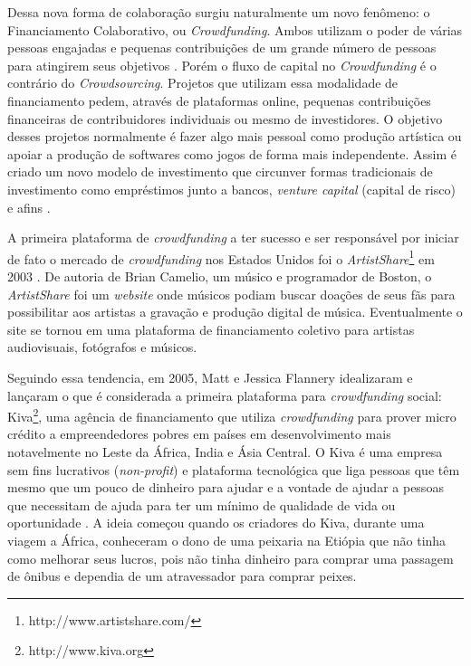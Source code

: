 Dessa nova forma de colaboração surgiu naturalmente um novo fenômeno: o Financiamento Colaborativo, ou \emph{Crowdfunding}. Ambos utilizam o poder de várias pessoas engajadas e pequenas contribuições de um grande número de pessoas para atingirem seus objetivos \cite{crowdfunding-culture}. Porém o fluxo de capital no \emph{Crowdfunding} é o contrário do \emph{Crowdsourcing}. Projetos que utilizam essa modalidade de financiamento pedem, através de plataformas online, pequenas contribuições financeiras de contribuidores individuais ou mesmo de investidores. O objetivo desses projetos normalmente é fazer algo mais pessoal como produção artística ou apoiar a produção de softwares como jogos de forma mais independente. Assim é criado um novo modelo de investimento que circunver formas tradicionais de investimento como empréstimos junto a bancos, \emph{venture capital} (capital de risco) e afins \cite{belleflamme2010}.

A primeira plataforma de \emph{crowdfunding} a ter sucesso e ser responsável por iniciar de fato o mercado de \emph{crowdfunding} nos Estados Unidos foi o \emph{ArtistShare}\footnote{http://www.artistshare.com/} em 2003 \cite{freedman2015brief}. De autoria de Brian Camelio, um músico e programador de Boston, o \emph{ArtistShare} foi um \emph{website} onde músicos podiam buscar doações de seus fãs para possibilitar aos artistas a gravação e produção digital de música. Eventualmente o site se tornou em uma plataforma de financiamento coletivo para artistas audiovisuais, fotógrafos e músicos.

Seguindo essa tendencia, em 2005, Matt e Jessica Flannery idealizaram e lançaram o que é considerada a primeira plataforma para \emph{crowdfunding} social: Kiva\footnote{http://www.kiva.org}, uma agência de financiamento que utiliza \emph{crowdfunding} para prover micro crédito a empreendedores pobres em países em desenvolvimento mais notavelmente no Leste da África, India e Ásia Central. O Kiva é uma empresa sem fins lucrativos (\emph{non-profit}) e plataforma tecnológica que liga pessoas que têm mesmo que um pouco de dinheiro para ajudar e a vontade de ajudar a pessoas que necessitam de ajuda para ter um mínimo de qualidade de vida ou oportunidade \cite{flannery2007kiva}. A ideia começou quando os criadores do Kiva, durante uma viagem a África, conheceram o dono de uma peixaria na Etiópia que não tinha como melhorar seus lucros, pois não tinha dinheiro para comprar uma passagem de ônibus e dependia de um atravessador para comprar peixes.

